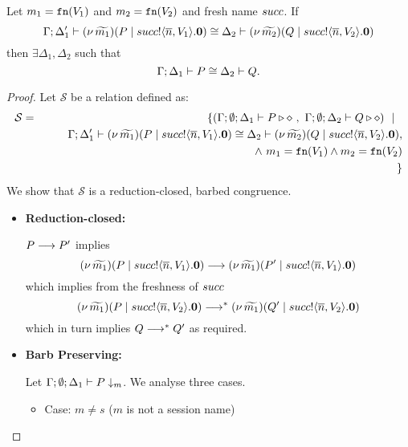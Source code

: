 


\begin{lemma}[Extrusion]\rm
	\label{lem:extrusion}
	Let $m_1 = \mathtt{fn}(V_1)$ and $m_2 = \mathtt{fn}(V_2)$ and fresh name $succ$. 
	If 
	\[
		\Gamma; \Delta_1' \vdash (\nu\, \widetilde{m_1})(P \;|\; succ ! \langle \overline{n}, V_1 \rangle . \mathbf{0}) \cong \Delta_2 \vdash (\nu\, \widetilde{m_2})(Q \;|\; succ ! \langle \overline{n}, V_2 \rangle . \mathbf{0})
	\]
	then $\exists \Delta_1, \Delta_2$ such that
	\[
		\Gamma; \Delta_1 \vdash P \cong \Delta_2 \vdash Q.
	\]
\end{lemma}

\begin{proof}
	\noi Let $\mathcal{S}$ be a relation defined as:
%
	\begin{eqnarray*}
		\mathcal{S}	&=&
					\{(\Gamma; \emptyset; \Delta_1 \vdash P \triangleright \diamond\ ,\ \Gamma; \emptyset; \Delta_2 \vdash Q \triangleright \diamond) \ \ |\ \  \\
				& &	\qquad \Gamma; \Delta_1' \vdash (\nu\, \widetilde{m_1})(P \;|\; succ ! \langle \overline{n}, V_1 \rangle . \mathbf{0}) \cong \Delta_2 \vdash (\nu\, \widetilde{m_2})(Q \;|\; succ ! \langle \overline{n}, V_2 \rangle . \mathbf{0}),\\
				&&   \qquad \land~ m_1 = \mathtt{fn}(V_1) \land m_2 = \mathtt{fn}(V_2) \\
		&&\}
	\end{eqnarray*}
%
	\noi We show that $\mathcal{S}$ is a reduction-closed, barbed congruence.


	\begin{itemize}
		\item	{\bf Reduction-closed:}

				$P \longrightarrow P'$
				implies
				\[
					(\nu\, \widetilde{m_1})(P \;|\; succ ! \langle \overline{n}, V_1 \rangle . \mathbf{0})
					\longrightarrow
					(\nu\, \widetilde{m_1})(P' \;|\; succ ! \langle \overline{n}, V_1 \rangle . \mathbf{0})
				\]
				which implies from the freshness of $succ$
				\[
					(\nu\, \widetilde{m_1})(P \;|\; succ ! \langle \overline{n}, V_2 \rangle . \mathbf{0})
					\longrightarrow^{*}
					(\nu\, \widetilde{m_1})(Q' \;|\; succ ! \langle \overline{n}, V_2 \rangle . \mathbf{0})
				\]
				which in turn implies
				$Q \longrightarrow^{*} Q'$ as required.

	\item	{\bf Barb Preserving:}

			Let $\Gamma; \emptyset; \Delta_1 \vdash P \downarrow_{m}$. We analyse three cases.
		    \begin{itemize}
				\item	Case: $m \not= s$ ($m$ is not a session name)


\end{itemize}
\end{itemize}
\end{proof}
